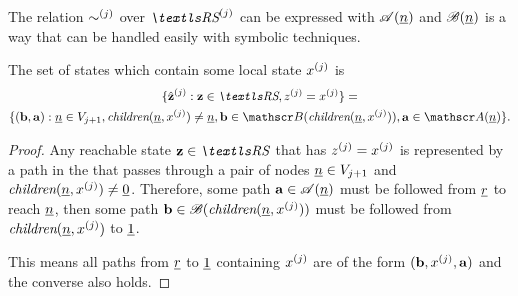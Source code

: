 The relation $\sim^{(j)}$ over $\loc{\RS}{j}$ can be expressed
with $\mathscr{A}(\underline{n})$ and $\mathscr{B}(\underline{n})$ is a way that
can be handled easily with symbolic techniques.

\begin{obs}
  \label{obs:genstor:symbolic:block:paths}
  The set of states which contain some local state $x^{(j)}$ is
  \begin{multline}
    \{\loc{\hat{\vec{z}}}{j} : \vec{z} \in \RS, \loc{z}{j} = \loc{x}{j}\} =\\ \{
    (\vec{b},\vec{a}) : \ddnode{n} \in V_{j + 1},
    \mddChildren(\ddnode{n}, \loc{x}{j}) \ne \ddnode{n}, \vec{b} \in
    \mddBelow(\mddChildren(\ddnode{n}, \loc{x}{j})), \vec{a} \in
    \mddAbove(\ddnode{n}) \} \text.
  \end{multline}
\end{obs}

\begin{proof}
  Any reachable state $\vec{z} \in \RS$ that has
  $z^{(j)} = x^{(j)}$ is represented by a path in the
   that passes through a pair of nodes
  $\underline{n} \in V_{j + 1}$ and
  $\textit{children}(\underline{n}, x^{(j)}) \ne \underline{0}$. Therefore,
  some path $\bm{\mathrm{a}} \in \mathscr{A}(\underline{n})$ must be followed from
  $\underline{r}$ to reach $\underline{n}$, then some path
  $\bm{\mathrm{b}} \in \mathscr{B}(\textit{children}(\underline{n}, x^{(j)}))$ must
  be followed from $\textit{children}(\underline{n}, x^{(j)})$ to
  $\underline{1}$.

  This means all paths from $\underline{r}$ to $\underline{1}$ containing
  $x^{(j)}$ are of the form $(\bm{\mathrm{b}}, x^{(j)}, \bm{\mathrm{a}})$ and
  the converse also holds.
\end{proof}

